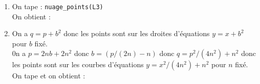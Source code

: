 \documentclass[a4paper,11pt]{book}
\begin{document}
\begin{enumerate}
{\tt [((r>((-b-sqrt(-b\verb|^|2+2000))/2)) \&\& (((-b+sqrt(-b\verb|^|2+2000))/2)>r))]}\\
On tape : 
\begin{verbatim}
paire_carre(n):={
local b,q,p,L,r,nmax;
L:=NULL;
pour b de 0 jusque sqrt(n) faire
nmax:=(sqrt(-b^2+2*n))/2-b/2;
pour r de 0 jusque nmax faire
p:=2*r*b+2*r^2;
q:=b^2+p;
L:=L,[p,q];
fpour
fpour
return L
}:;
\end{verbatim}
Puis, on tape :\\
{\tt L:=paire\_carre(100):;}\\
Le calcul est tres rapide !!!!!\\
On tape : {\tt dim(L)}\\
On obtient instantan\'ement : {\tt 48}\\
On tape :\\
{\tt L3:=paire\_carre(1000):;}\\
Le calcul est tres rapide !!!!!\\
On tape : {\tt dim(L3)}\\
On obtient : {\tt 421}
\item 
On tape : {\tt nuage\_points(L3)}\\
On obtient :\\
\item
On a $q=p+b^2$ donc les points sont sur les droites d'\'equations $y=x+b^2$ pour
$b$ fix\'e.\\
0n a $p=2nb+2n^2$ donc $b=(p/(2n)-n)$ donc  $q=p^2/(4n^2)+n^2$
donc les points sont sur les courbes 
d'\'equations $y=x^2/(4n^2)+n^2$ pour $n$ fix\'e.\\
On tape et on obtient :\\
\end{enumerate}
\end{document}
